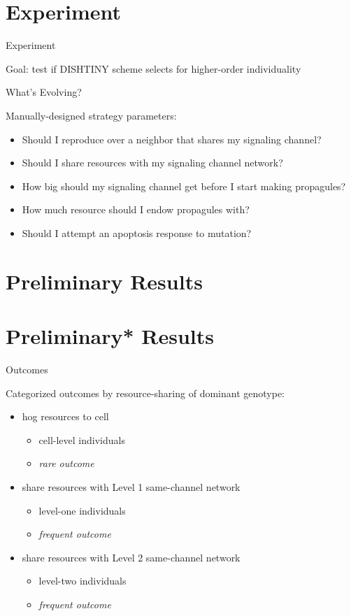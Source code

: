 \section{Experiment}

\begin{frame}{Experiment}

Goal: test if DISHTINY scheme selects for higher-order individuality

\end{frame}

\begin{frame}{What's Evolving?}

Manually-designed strategy parameters:
\begin{itemize}
\item Should I reproduce over a neighbor that shares my signaling channel?
\item Should I share resources with my signaling channel network?
\item How big should my signaling channel get before I start making propagules?
\item How much resource should I endow propagules with?
\item Should I attempt an apoptosis response to mutation?
\end{itemize}
\end{frame}

\section{Preliminary Results}
\section{Preliminary\** Results}


\begin{frame}{Outcomes}

Categorized outcomes by resource-sharing of dominant genotype:
\begin{itemize}
\item hog resources to cell
\begin{itemize}
\item cell-level individuals
\item \textit{rare outcome}
\end{itemize}
\item share resources with Level 1 same-channel network
\begin{itemize}
\item level-one individuals
\item \textit{frequent outcome}
\end{itemize}
\item share resources with Level 2 same-channel network
\begin{itemize}
\item level-two individuals
\item \textit{frequent outcome}
\end{itemize}
\end{itemize}

\end{frame}

